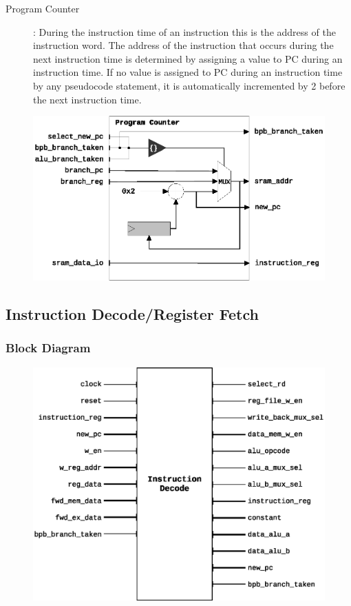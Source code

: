 \documentclass{article}
\begin{document}
  \begin{description}
    \item [Program Counter]: During the instruction time of an instruction this is the
address of the instruction word. The address of the instruction that occurs during
the next instruction time is determined by assigning a value to PC during an instruction time. If no value is assigned to PC during an instruction time by any pseudocode statement, it is automatically incremented by 2 before the next
instruction time.

  \end{description}

  \begin{figure}[H]
    \centering
    \includegraphics[width=\linewidth]{pictures/datapath/if_datapath.eps}
  \end{figure}   

  \newpage
  \subsection{Instruction Decode/Register Fetch}
  \subsubsection{Block Diagram}
  \begin{figure}[H]
    \centering
    \includegraphics[width=.8\linewidth]{pictures/blocks/id_block.eps}
  \end{figure} 
  
\end{document}
